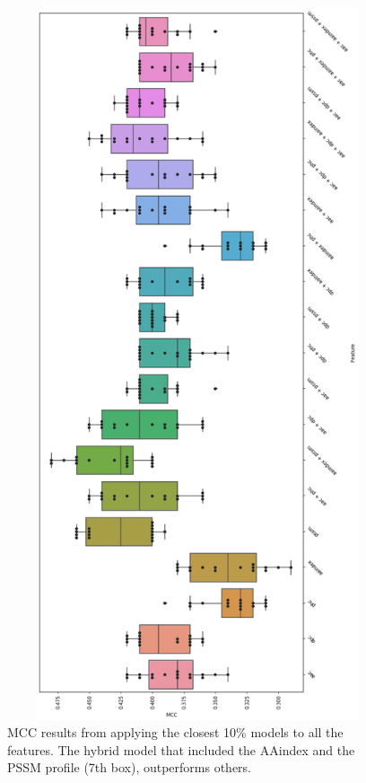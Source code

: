 








\begin{figure}[ht]
    \centering
    \includegraphics[width=14cm,height=21cm]{figures/15MccAllModels.png}
    \caption{MCC results from applying the closest 10\% models to all the features.
    The hybrid model that included the AAindex and the PSSM profile (7th box), outperforms others.}
    \label{fig:MccAllModels}
\end{figure}
